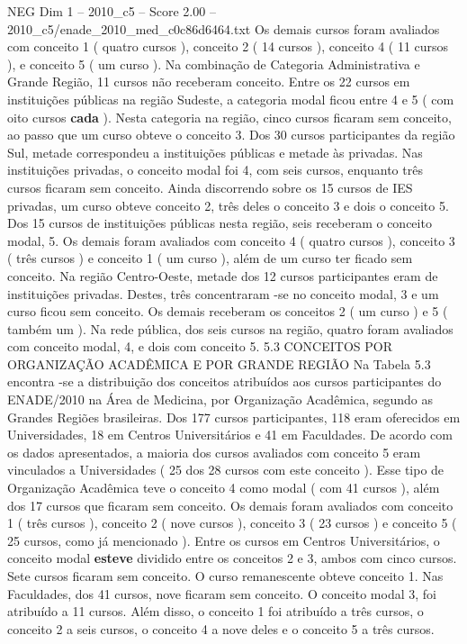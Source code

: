 \begin{textsample}{NEG Dim 1 – 2010\_c5 – Score 2.00 – 2010\_c5/enade\_2010\_med\_c0c86d6464.txt}
Os demais cursos foram avaliados com conceito 1 ( quatro cursos ), conceito 2 ( 14 cursos ), conceito 4 ( 11 cursos ), e conceito 5 ( um curso ).
Na combinação de Categoria Administrativa e Grande Região, 11 cursos não receberam conceito.
Entre os 22 cursos em instituições públicas na região Sudeste, a categoria modal ficou entre 4 e 5 ( com oito cursos \textbf{cada} ).
Nesta categoria na região, cinco cursos ficaram sem conceito, ao passo que um curso obteve o conceito 3.
Dos 30 cursos participantes da região Sul, metade correspondeu a instituições públicas e metade às privadas.
Nas instituições privadas, o conceito modal foi 4, com seis cursos, enquanto três cursos ficaram sem conceito.
Ainda discorrendo sobre os 15 cursos de IES privadas, um curso obteve conceito 2, três deles o conceito 3 e dois o conceito 5.
Dos 15 cursos de instituições públicas nesta região, seis receberam o conceito modal, 5.
Os demais foram avaliados com conceito 4 ( quatro cursos ), conceito 3 ( três cursos ) e conceito 1 ( um curso ), além de um curso ter ficado sem conceito.
Na região Centro-Oeste, metade dos 12 cursos participantes eram de instituições privadas.
Destes, três concentraram -se no conceito modal, 3 e um curso ficou sem conceito.
Os demais receberam os conceitos 2 ( um curso ) e 5 ( também um ).
Na rede pública, dos seis cursos na região, quatro foram avaliados com conceito modal, 4, e dois com conceito 5. 5.3 CONCEITOS POR ORGANIZAÇÃO ACADÊMICA E POR GRANDE REGIÃO Na Tabela 5.3 encontra -se a distribuição dos conceitos atribuídos aos cursos participantes do ENADE/2010 na Área de Medicina, por Organização Acadêmica, segundo as Grandes Regiões brasileiras.
Dos 177 cursos participantes, 118 eram oferecidos em Universidades, 18 em Centros Universitários e 41 em Faculdades.
De acordo com os dados apresentados, a maioria dos cursos avaliados com conceito 5 eram vinculados a Universidades ( 25 dos 28 cursos com este conceito ).
Esse tipo de Organização Acadêmica teve o conceito 4 como modal ( com 41 cursos ), além dos 17 cursos que ficaram sem conceito.
Os demais foram avaliados com conceito 1 ( três cursos ), conceito 2 ( nove cursos ), conceito 3 ( 23 cursos ) e conceito 5 ( 25 cursos, como já mencionado ).
Entre os cursos em Centros Universitários, o conceito modal \textbf{esteve} dividido entre os conceitos 2 e 3, ambos com cinco cursos.
Sete cursos ficaram sem conceito.
O curso remanescente obteve conceito 1.
Nas Faculdades, dos 41 cursos, nove ficaram sem conceito.
O conceito modal 3, foi atribuído a 11 cursos.
Além disso, o conceito 1 foi atribuído a três cursos, o conceito 2 a seis cursos, o conceito 4 a nove deles e o conceito 5 a três cursos.

\end{textsample}

